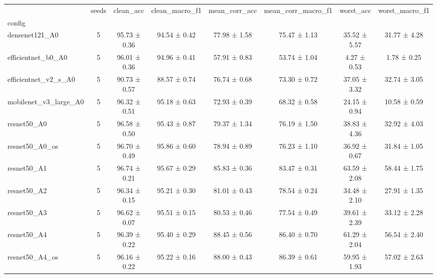 \begin{tabular}{lccccccc}
\toprule
 & seeds & clean\_acc & clean\_macro\_f1 & mean\_corr\_acc & mean\_corr\_macro\_f1 & worst\_acc & worst\_macro\_f1 \\
config &  &  &  &  &  &  &  \\
\midrule
densenet121\_A0 & 5 & 95.73 ± 0.36 & 94.54 ± 0.42 & 77.98 ± 1.58 & 75.47 ± 1.13 & 35.52 ± 5.57 & 31.77 ± 4.28 \\
efficientnet\_b0\_A0 & 5 & 96.01 ± 0.36 & 94.96 ± 0.41 & 57.91 ± 0.83 & 53.74 ± 1.04 & 4.27 ± 0.53 & 1.78 ± 0.25 \\
efficientnet\_v2\_s\_A0 & 5 & 90.73 ± 0.57 & 88.57 ± 0.74 & 76.74 ± 0.68 & 73.30 ± 0.72 & 37.05 ± 3.32 & 32.74 ± 3.05 \\
mobilenet\_v3\_large\_A0 & 5 & 96.32 ± 0.51 & 95.18 ± 0.63 & 72.93 ± 0.39 & 68.32 ± 0.58 & 24.15 ± 0.94 & 10.58 ± 0.59 \\
resnet50\_A0 & 5 & 96.58 ± 0.50 & 95.43 ± 0.87 & 79.37 ± 1.34 & 76.19 ± 1.50 & 38.83 ± 4.36 & 32.92 ± 4.03 \\
resnet50\_A0\_os & 5 & 96.70 ± 0.49 & 95.86 ± 0.60 & 78.94 ± 0.89 & 76.23 ± 1.10 & 36.92 ± 0.67 & 31.84 ± 1.05 \\
resnet50\_A1 & 5 & 96.74 ± 0.21 & 95.67 ± 0.29 & 85.83 ± 0.36 & 83.47 ± 0.31 & 63.59 ± 2.08 & 58.44 ± 1.75 \\
resnet50\_A2 & 5 & 96.34 ± 0.15 & 95.21 ± 0.30 & 81.01 ± 0.43 & 78.54 ± 0.24 & 34.48 ± 2.10 & 27.91 ± 1.35 \\
resnet50\_A3 & 5 & 96.62 ± 0.07 & 95.51 ± 0.15 & 80.53 ± 0.46 & 77.54 ± 0.49 & 39.61 ± 2.39 & 33.12 ± 2.28 \\
resnet50\_A4 & 5 & 96.39 ± 0.22 & 95.40 ± 0.29 & 88.45 ± 0.56 & 86.40 ± 0.70 & 61.29 ± 2.04 & 56.54 ± 2.40 \\
resnet50\_A4\_os & 5 & 96.16 ± 0.22 & 95.22 ± 0.16 & 88.00 ± 0.43 & 86.39 ± 0.61 & 59.95 ± 1.93 & 57.02 ± 2.63 \\
\bottomrule
\end{tabular}
